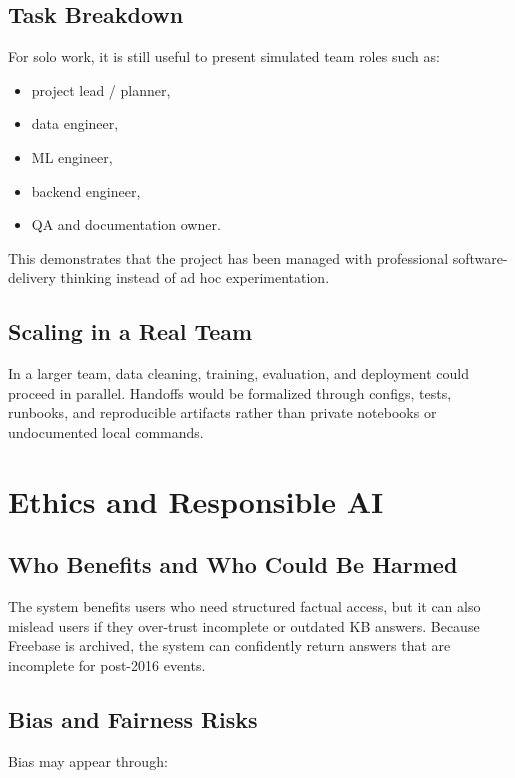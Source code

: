 \documentclass[a4paper,11pt]{article}
\begin{document}
\subsection{Task Breakdown}

For solo work, it is still useful to present simulated team roles such as:

\begin{itemize}[leftmargin=1.2cm]
  \item project lead / planner,
  \item data engineer,
  \item ML engineer,
  \item backend engineer,
  \item QA and documentation owner.
\end{itemize}

This demonstrates that the project has been managed with professional software-delivery thinking instead of ad hoc experimentation.

\subsection{Scaling in a Real Team}

In a larger team, data cleaning, training, evaluation, and deployment could proceed in parallel. Handoffs would be formalized through configs, tests, runbooks, and reproducible artifacts rather than private notebooks or undocumented local commands.

\section{Ethics and Responsible AI}

\subsection{Who Benefits and Who Could Be Harmed}

The system benefits users who need structured factual access, but it can also mislead users if they over-trust incomplete or outdated KB answers. Because Freebase is archived, the system can confidently return answers that are incomplete for post-2016 events.

\subsection{Bias and Fairness Risks}

Bias may appear through:
\end{document}
